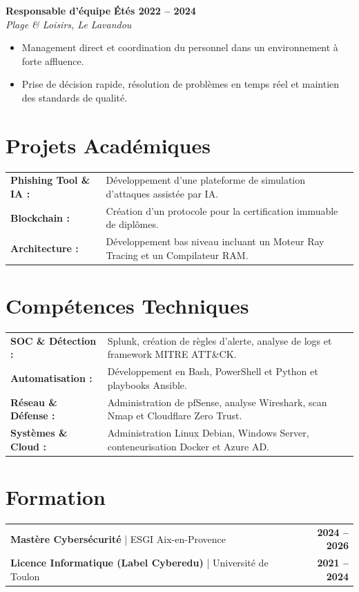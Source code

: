 \documentclass[10pt, a4paper]{article}
\begin{document}
	\textbf{Responsable d'équipe} \hfill \textbf{Étés 2022 -- 2024} \\
	\textit{Plage \& Loisirs, Le Lavandou}
	\begin{itemize}
		\item Management direct et coordination du personnel dans un environnement à forte affluence.
		\item Prise de décision rapide, résolution de problèmes en temps réel et maintien des standards de qualité.
	\end{itemize}
	
	\section*{Projets Académiques}
	\begin{tabular}{@{}P G@{}}
		\textbf{Phishing Tool \& IA :} & Développement d'une plateforme de simulation d'attaques assistée par IA.\\
		\textbf{Blockchain :} & Création d'un protocole pour la certification immuable de diplômes. \\
		\textbf{Architecture :} & Développement bas niveau incluant un Moteur Ray Tracing et un Compilateur RAM.
	\end{tabular}
	
	\section*{Compétences Techniques}
	\begin{tabular}{@{}P G@{}}
		\textbf{SOC \& Détection :} & Splunk, création de règles d'alerte, analyse de logs et framework MITRE ATT\&CK. \\
		\textbf{Automatisation :} & Développement en Bash, PowerShell et Python et playbooks Ansible. \\
		\textbf{Réseau \& Défense :} & Administration de pfSense, analyse Wireshark, scan Nmap et Cloudflare Zero Trust. \\
		\textbf{Systèmes \& Cloud :} & Administration Linux Debian, Windows Server, conteneurisation Docker et Azure AD.
	\end{tabular}
	
	\section*{Formation}
	\noindent
	\begin{tabular*}{\textwidth}{@{}l@{\extracolsep{\fill}}r@{}}
		\textbf{Mastère Cybersécurité} | ESGI Aix-en-Provence & \textbf{2024 -- 2026} \\
		\textbf{Licence Informatique (Label Cyberedu)} | Université de Toulon & \textbf{2021 -- 2024} \\
	\end{tabular*}
	
	
\end{document}

